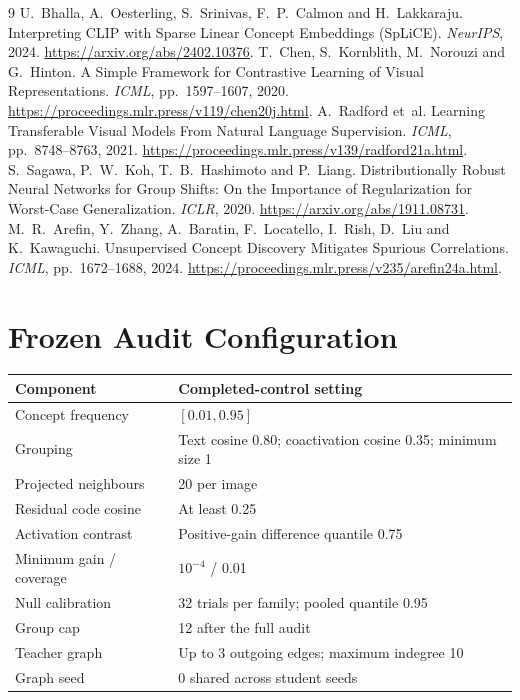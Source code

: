 \documentclass[11pt,a4paper]{article}
\begin{document}
\begin{thebibliography}{9}
U.~Bhalla, A.~Oesterling, S.~Srinivas, F.~P.~Calmon and H.~Lakkaraju.
Interpreting CLIP with Sparse Linear Concept Embeddings (SpLiCE).
\emph{NeurIPS}, 2024. \url{https://arxiv.org/abs/2402.10376}.
T.~Chen, S.~Kornblith, M.~Norouzi and G.~Hinton.
A Simple Framework for Contrastive Learning of Visual Representations.
\emph{ICML}, pp.~1597--1607, 2020.
\url{https://proceedings.mlr.press/v119/chen20j.html}.
A.~Radford et~al.
Learning Transferable Visual Models From Natural Language Supervision.
\emph{ICML}, pp.~8748--8763, 2021.
\url{https://proceedings.mlr.press/v139/radford21a.html}.
S.~Sagawa, P.~W.~Koh, T.~B.~Hashimoto and P.~Liang.
Distributionally Robust Neural Networks for Group Shifts: On the Importance
of Regularization for Worst-Case Generalization.
\emph{ICLR}, 2020. \url{https://arxiv.org/abs/1911.08731}.
M.~R.~Arefin, Y.~Zhang, A.~Baratin, F.~Locatello, I.~Rish, D.~Liu and K.~Kawaguchi.
Unsupervised Concept Discovery Mitigates Spurious Correlations.
\emph{ICML}, pp.~1672--1688, 2024.
\url{https://proceedings.mlr.press/v235/arefin24a.html}.
\end{thebibliography}

\clearpage
\appendix
\section{Frozen Audit Configuration}
\begin{table}[ht]
\centering
\begin{tabularx}{\linewidth}{lX}
\toprule
Component & Completed-control setting \\
\midrule
Concept frequency & $[0.01,0.95]$ \\
Grouping & Text cosine 0.80; coactivation cosine 0.35; minimum size 1 \\
Projected neighbours & 20 per image \\
Residual code cosine & At least 0.25 \\
Activation contrast & Positive-gain difference quantile 0.75 \\
Minimum gain / coverage & $10^{-4}$ / 0.01 \\
Null calibration & 32 trials per family; pooled quantile 0.95 \\
Group cap & 12 after the full audit \\
Teacher graph & Up to 3 outgoing edges; maximum indegree 10 \\
Graph seed & 0 shared across student seeds \\
\bottomrule
\end{tabularx}
\end{table}
\end{document}
